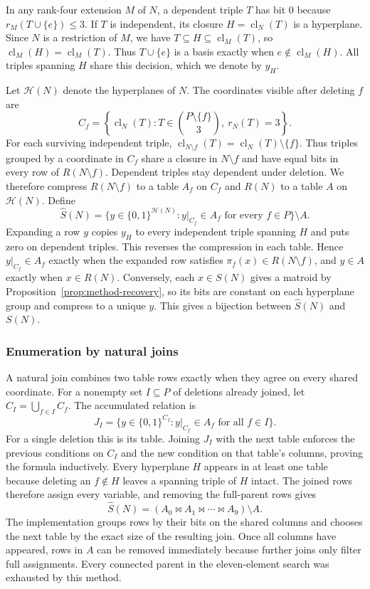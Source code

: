 \documentclass[11pt,letterpaper,titlepage]{article}
\DeclareMathOperator{\cl}{cl}
\begin{document}
In any rank-four extension \(M\) of \(N\), a dependent triple \(T\) has bit 0 because \(r_M(T\cup\{e\})\leq 3\). If \(T\) is independent, its closure \(H=\cl_N(T)\) is a hyperplane. Since \(N\) is a restriction of \(M\), we have \(T\subseteq H\subseteq\cl_M(T)\), so \(\cl_M(H)=\cl_M(T)\). Thus \(T\cup\{e\}\) is a basis exactly when \(e\notin\cl_M(H)\). All triples spanning \(H\) share this decision, which we denote by \(y_H\).

Let \(\mathcal{H}(N)\) denote the hyperplanes of \(N\). The coordinates visible after deleting \(f\) are
\[
 C_f=\left\{\operatorname{cl}_N(T):
 T\in\binom{P\setminus\{f\}}{3},\ r_N(T)=3\right\}.
\]
For each surviving independent triple, \(\cl_{N\setminus f}(T)=\cl_N(T)\setminus\{f\}\). Thus triples grouped by a coordinate in \(C_f\) share a closure in \(N\setminus f\) and have equal bits in every row of \(R(N\setminus f)\). Dependent triples stay dependent under deletion. We therefore compress \(R(N\setminus f)\) to a table \(A_f\) on \(C_f\) and \(R(N)\) to a table \(A\) on \(\mathcal{H}(N)\). Define
\[
 \widehat S(N)=
 \bigl\{y\in\{0,1\}^{\mathcal{H}(N)}:
 y|_{C_f}\in A_f\text{ for every }f\in P\bigr\}\setminus A.
\]
Expanding a row \(y\) copies \(y_H\) to every independent triple spanning \(H\) and puts zero on dependent triples. This reverses the compression in each table. Hence \(y|_{C_f}\in A_f\) exactly when the expanded row satisfies \(\pi_f(x)\in R(N\setminus f)\), and \(y\in A\) exactly when \(x\in R(N)\). Conversely, each \(x\in S(N)\) gives a matroid by Proposition~\ref{prop:method-recovery}, so its bits are constant on each hyperplane group and compress to a unique \(y\). This gives a bijection between \(\widehat S(N)\) and \(S(N)\).

\subsubsection{Enumeration by natural joins}

A natural join combines two table rows exactly when they agree on every shared coordinate. For a nonempty set \(I\subseteq P\) of deletions already joined, let \(C_I=\bigcup_{f\in I}C_f\). The accumulated relation is
\[
 J_I=\{y\in\{0,1\}^{C_I}:y|_{C_f}\in A_f\text{ for all }f\in I\}.
\]
For a single deletion this is its table. Joining \(J_I\) with the next table enforces the previous conditions on \(C_I\) and the new condition on that table's columns, proving the formula inductively. Every hyperplane \(H\) appears in at least one table because deleting an \(f\notin H\) leaves a spanning triple of \(H\) intact. The joined rows therefore assign every variable, and removing the full-parent rows gives
\[
 \widehat S(N)=(A_0\bowtie A_1\bowtie\cdots\bowtie A_9)\setminus A.
\]
The implementation groups rows by their bits on the shared columns and chooses the next table by the exact size of the resulting join. Once all columns have appeared, rows in \(A\) can be removed immediately because further joins only filter full assignments. Every connected parent in the eleven-element search was exhausted by this method.
\end{document}
